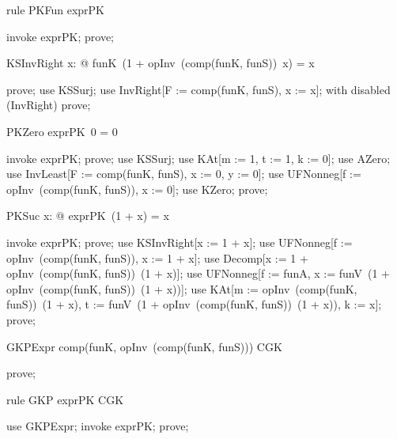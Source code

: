 \documentclass{article}
\begin{document}
\begin{theorem}{rule PKFun}
  exprPK \in \nat \fun \nat
\end{theorem}

\begin{zproof}
invoke exprPK;
prove;
\end{zproof}

\begin{theorem}{KSInvRight}
  \forall x: \nat @ funK~(1 + opInv~(comp(funK, funS))~x) = x
\end{theorem}

\begin{zproof}
prove;
use KSSurj;
use InvRight[F := comp(funK, funS), x := x];
with disabled (InvRight) prove;
\end{zproof}

\begin{theorem}{PKZero}
  exprPK~0 = 0
\end{theorem}

\begin{zproof}
invoke exprPK;
prove;
use KSSurj;
use KAt[m := 1, t := 1, k := 0];
use AZero;
use InvLeast[F := comp(funK, funS), x := 0, y := 0];
use UFNonneg[f := opInv~(comp(funK, funS)), x := 0];
use KZero;
prove;
\end{zproof}

\begin{theorem}{PKSuc}
  \forall x: \nat @ exprPK~(1 + x) = x
\end{theorem}

\begin{zproof}
invoke exprPK;
prove;
use KSInvRight[x := 1 + x];
use UFNonneg[f := opInv~(comp(funK, funS)), x := 1 + x];
use Decomp[x := 1 + opInv~(comp(funK, funS))~(1 + x)];
use UFNonneg[f := funA, x := funV~(1 + opInv~(comp(funK, funS))~(1 + x))];
use KAt[m := opInv~(comp(funK, funS))~(1 + x), t := funV~(1 + opInv~(comp(funK, funS))~(1 + x)), k := x];
prove;
\end{zproof}

\begin{theorem}{GKPExpr}
  comp(funK, opInv~(comp(funK, funS))) \in CGK
\end{theorem}

\begin{zproof}
prove;
\end{zproof}

\begin{theorem}{rule GKP}
  exprPK \in CGK
\end{theorem}

\begin{zproof}
use GKPExpr;
invoke exprPK;
prove;
\end{zproof}
\end{document}
